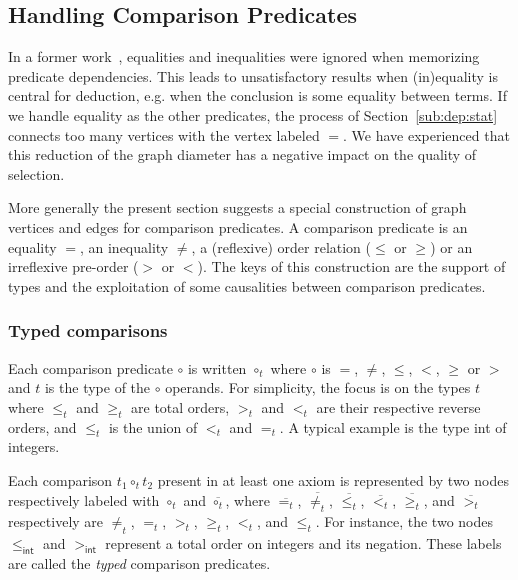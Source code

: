 \documentclass{acm_proc_article-sp}
\theoremstyle{nonumberplain}
\begin{document}
\subsection{Handling Comparison Predicates}\label{sub:dep:eq}
In a former work~\cite{couchot07FTP}, equalities and inequalities were
ignored when memorizing predicate dependencies. This leads to
unsatisfactory results when (in)equality is central for deduction, e.g.
when the conclusion is some equality between terms. If we handle
equality as the other predicates, the process of
Section~\ref{sub:dep:stat} connects too many vertices with the vertex
labeled $=$. We have experienced that this reduction of the graph
diameter has a negative impact on the quality of selection.



More generally the present section suggests a special construction of
graph vertices and edges for comparison predicates. A comparison
predicate is an equality $=$, an inequality $\neq$, a (reflexive) order
relation ($\leq$ or $\geq$) or an irreflexive pre-order ($>$ or $<$).
The keys of this construction are the support of types and the
exploitation of some causalities between comparison predicates.



\subsubsection{Typed comparisons}
Each comparison predicate $\circ$ is written $\circ_t$ where $\circ$ is
$=$, $\neq$, $\le$, $<$, $\ge$ or $>$ and $t$ is the type of the
$\circ$ operands. For simplicity, the focus is on
 the types $t$ where $\le_t$ and $\ge_t$ are total orders, $>_t$ and
 $<_t$ are their respective reverse orders, and $\le_t$ is the union of
 $<_t$ and $=_t$. A typical example is the type \textsf{int} of
 integers.





Each comparison $t_1 \circ_t t_2$ present in at least one axiom
is represented by two nodes respectively labeled with $\circ_t$ and
$\overline{\circ_t}$, where $\overline{=_t}$, $\overline{\neq_t}$,
$\overline{\le_t}$, $\overline{<_t}$, $\overline{\ge_t}$, and
$\overline{>_t}$ respectively are $\neq_t$, $=_t$, $>_t$, $\ge_t$,
$<_t$, and $\le_t$. For instance, the two nodes $\le_{\textsf{int}}$
and $>_{\textsf{int}}$ represent a total order on integers and its
negation. These labels are called the \emph{typed} comparison
predicates.
\end{document}
